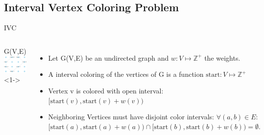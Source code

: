 \subsection{Interval Vertex Coloring Problem}
\begin{frame}{IVC}
  \begin{columns}
        \centering
        G(V,E) \\
        \null
        \includegraphics[width=1\textwidth]{figures/ICV0.pdf}<1-> \\

    \begin{itemize}
      \item<1-> Let G(V,E) be an undirected graph and $w : V \mapsto \mathbb{Z^+}$ the weights.
      \null
      \vfill
      \null
      \item<2-> A interval coloring of the vertices of G is a function $\text{start} : V \mapsto \mathbb{Z^+}$
      \null
      \vfill
      \null
      \item<3-> Vertex v is colored with open interval:
      $[\text{start}(v), \text{start}(v)+w(v))$
      \null
      \vfill
      \null
      \item<4-> Neighboring Vertices must have disjoint color intervals: 
      $\forall (a, b) \in E:$ \\
      $ [\text{start}(a), \text{start}(a) + w(a)) \cap [\text{start}(b), \text{start}(b) + w(b)) = \emptyset.$
      
    \end{itemize}
  \end{columns}
\end{frame}

